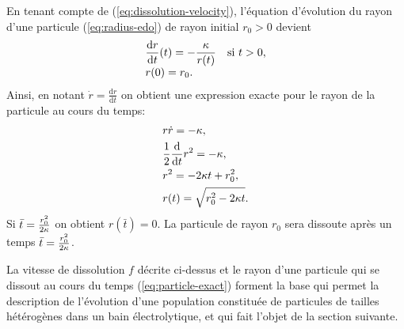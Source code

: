 En tenant compte de (\ref{eq:dissolution-velocity}), l'équation
d'évolution du rayon d'une particule (\ref{eq:radius-edo}) de rayon initial $r_0 > 0$
 devient
\begin{align}\label{eq:radius-edo-cst-diss-rate}
  \begin{array}{l}
    \displaystyle\frac{\mathrm d r}{\mathrm d t}(t) = -\displaystyle\frac{\kappa}{r(t)} \quad \text{si } t
    > 0,\\[0.5\normalbaselineskip]
    r(0) = r_0.
  \end{array}
\end{align}
Ainsi, en notant $\dot r = \frac{\mathrm dr}{\mathrm dt}$ on obtient
une expression exacte pour le rayon de la particule au cours du temps:
\begin{align}
  &r\dot r = -\kappa,\nonumber\\
  &\frac{1}{2}\frac{\mathrm d}{\mathrm dt}r^2 = -\kappa,\nonumber\\
  &r^2 = -2\kappa t + r_0^2,\nonumber\\
  &r(t) = \sqrt{r_0^2-2\kappa t}.\label{eq:particle-exact}
\end{align}
Si $\bar t = \frac{r_0^2}{2\kappa}$ on obtient $r(\bar
t) = 0$. La particule de rayon $r_0$ sera dissoute après un temps $\bar
t = \frac{r_0^2}{2\kappa}$.

La vitesse de dissolution $f$ décrite ci-dessus et le rayon d'une
particule qui se dissout au cours du temps (\ref{eq:particle-exact})
forment la base qui permet la description de l'évolution d'une
population constituée de particules de tailles hétérogènes dans un
bain électrolytique, et qui fait l'objet de la section suivante.
